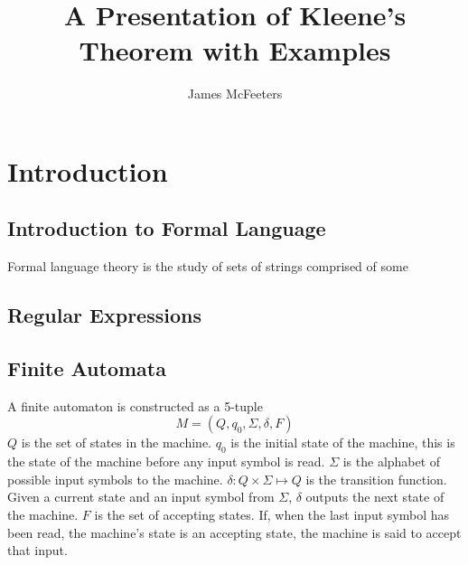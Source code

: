 \documentclass{bcthesis}
\title{A Presentation of Kleene's Theorem with Examples}
\author{James McFeeters}
\newif\ifbuildfrontmatter
\begin{document}
\ifbuildfrontmatter
\frontmatter

	\maketitle

	\begin{abstract}
		Your abstract goes here.
	\end{abstract}


	\begin{acknowledgments}
		Here you should acknowledge any special help on your project, or particular influences on your life or mathematical development.
	\end{acknowledgments}

	\tableofcontents
\fi

\mainmatter

\chapter{Introduction}%
\label{ch:introduction}

	\section{Introduction to Formal Language} %
	\label{sec:introduction_to_formal_language}

		Formal language theory is the study of sets of strings comprised of some 


	\section{Regular Expressions} %
	\label{sec:regular_expressions}
		

	\section{Finite Automata} %
	\label{sec:finite_automata}
		A finite automaton is constructed as a 5-tuple
		\[
			M = (Q, q_0, \Sigma, \delta, F)
		\]
		$Q$ is the set of states in the machine.
		$q_0$ is the initial state of the machine, this is the state of the machine before any input symbol is read.
		$\Sigma$ is the alphabet of possible input symbols to the machine.
		$\delta: Q \times \Sigma \mapsto Q$ is the transition function.
		Given a current state and an input symbol from $\Sigma$, $\delta$ outputs the next state of the machine.
		$F$ is the set of accepting states.
		If, when the last input symbol has been read, the machine's state is an accepting state, the machine is said to accept that input.
\end{document}
